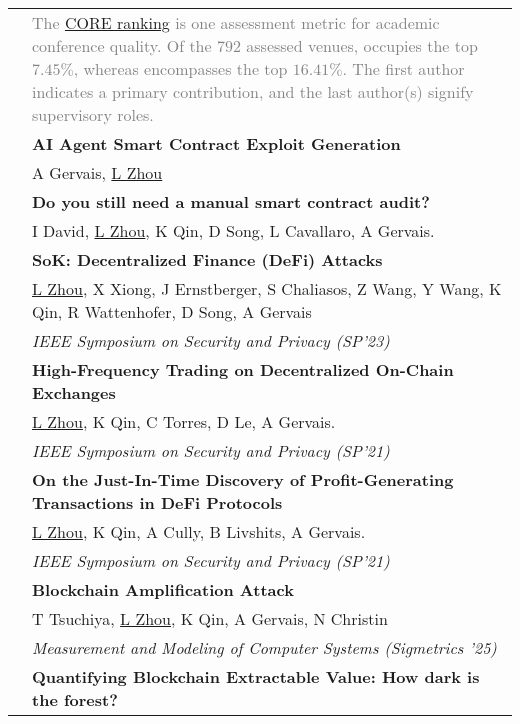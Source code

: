 \documentclass[letterpaper, 8pt]{article}
\newcommand{\corerankingAA}{\corebox{red}{30}{\xspace A* \xspace}\xspace}
\newcommand{\corerankingA}{\corebox{red}{15}{\xspace A \xspace}\xspace}
\newcommand{\tagSecurity}{\corebox{blue}{10}{Security}\xspace}
\newcommand{\tagPrivacy}{\corebox{green}{10}{Privacy}\xspace}
\newcommand{\tagML}{\corebox{yellow}{20}{Machine Learning}\xspace}
\newcommand{\tagSA}{\corebox{brown}{20}{System Analysis}\xspace}
\begin{document}
\begin{longtable}{p{0.5in}p{5.5in}}
\nohyphens{\color{OliveGreen}{Selected Publications +Preprints}} 
& \noindent\textcolor{gray}{\small The \href{http://portal.core.edu.au/conf-ranks/}{CORE ranking} is one assessment metric for academic conference quality. Of the $792$ assessed venues, \corerankingAA occupies the top $7.45\%$, whereas \corerankingA encompasses the top $16.41\%$. The first author indicates a primary contribution, and the last author(s) signify supervisory roles.}\\
& \textbf{AI Agent Smart Contract Exploit Generation} \tagSecurity \tagML \\
& {\footnotesize A Gervais, \underline{L Zhou}} \\
& \textbf{Do you still need a manual smart contract audit?} \tagSecurity \tagML \\
& {\footnotesize I David, \underline{L Zhou}, K Qin, D Song, L Cavallaro, A Gervais.} \\
& \textbf{SoK: Decentralized Finance (DeFi) Attacks} \tagSecurity \tagPrivacy \\
& {\footnotesize \underline{L Zhou}, X Xiong, J Ernstberger, S Chaliasos, Z Wang, Y Wang, K Qin, R Wattenhofer, D Song, A Gervais } \\
& {\footnotesize\corerankingAA \textit{IEEE Symposium on Security and Privacy (SP'23)}}\\
& \textbf{High-Frequency Trading on Decentralized On-Chain Exchanges} \tagSecurity \\
& {\footnotesize \underline{L Zhou}, K Qin, C Torres, D Le, A Gervais. } \\
& {\footnotesize \corerankingAA \textit{IEEE Symposium on Security and Privacy (SP'21)}}\\
& \textbf{On the Just-In-Time Discovery of Profit-Generating Transactions in DeFi Protocols} \tagSecurity \tagSA \\
& {\footnotesize \underline{L Zhou}, K Qin, A Cully, B Livshits, A Gervais.} \\
& {\footnotesize \corerankingAA \textit{IEEE Symposium on Security and Privacy (SP'21)}}\\
& \textbf{Blockchain Amplification Attack} \tagSecurity \\
& {\footnotesize T Tsuchiya, \underline{L Zhou}, K Qin, A Gervais, N Christin} \\
& {\footnotesize \corerankingAA \textit{Measurement and Modeling of Computer Systems (Sigmetrics '25)}}\\
& \textbf{Quantifying Blockchain Extractable Value: How dark is the forest?} \tagSecurity \\

\end{longtable}
\end{document}
